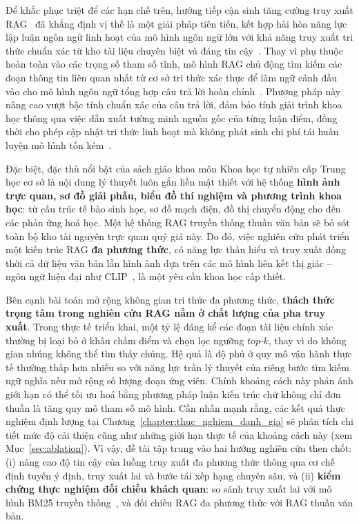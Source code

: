 Để khắc phục triệt để các hạn chế trên, hướng tiếp cận sinh tăng cường truy xuất RAG~\cite{lewis2020retrieval} đã khẳng định vị thế là một giải pháp tiên tiến, kết hợp hài hòa năng lực lập luận ngôn ngữ linh hoạt của mô hình ngôn ngữ lớn với khả năng truy xuất tri thức chuẩn xác từ kho tài liệu chuyên biệt và đáng tin cậy~\cite{gao2023ragsurvey, yan2024crag, jeong2024adaptiverag}. Thay vì phụ thuộc hoàn toàn vào các trọng số tham số tĩnh, mô hình RAG chủ động tìm kiếm các đoạn thông tin liên quan nhất từ cơ sở tri thức xác thực để làm ngữ cảnh đầu vào cho mô hình ngôn ngữ tổng hợp câu trả lời hoàn chỉnh~\cite{lewis2020retrieval, guu2020realm}. Phương pháp này nâng cao vượt bậc tính chuẩn xác của câu trả lời, đảm bảo tính giải trình khoa học thông qua việc dẫn xuất tường minh nguồn gốc của từng luận điểm, đồng thời cho phép cập nhật tri thức linh hoạt mà không phát sinh chi phí tái huấn luyện mô hình tốn kém~\cite{gao2023ragsurvey}.

Đặc biệt, đặc thù nổi bật của sách giáo khoa môn Khoa học tự nhiên cấp Trung học cơ sở là nội dung lý thuyết luôn gắn liền mật thiết với hệ thống \textbf{hình ảnh trực quan, sơ đồ giải phẫu, biểu đồ thí nghiệm và phương trình khoa học}: từ cấu trúc tế bào sinh học, sơ đồ mạch điện, đồ thị chuyển động cho đến các phản ứng hoá học. Một hệ thống RAG truyền thống thuần văn bản sẽ bỏ sót toàn bộ kho tài nguyên trực quan quý giá này. Do đó, việc nghiên cứu phát triển một kiến trúc RAG \textbf{đa phương thức}, có năng lực thấu hiểu và truy xuất đồng thời cả dữ liệu văn bản lẫn hình ảnh dựa trên các mô hình liên kết thị giác -- ngôn ngữ hiện đại như CLIP~\cite{radford2021clip}, là một yêu cầu khoa học cấp thiết.

Bên cạnh bài toán mở rộng không gian tri thức đa phương thức, \textbf{thách thức trọng tâm trong nghiên cứu RAG nằm ở chất lượng của pha truy xuất}. Trong thực tế triển khai, một tỷ lệ đáng kể các đoạn tài liệu chính xác thường bị loại bỏ ở khâu chấm điểm và chọn lọc ngưỡng $top\text{-}k$, thay vì do không gian nhúng không thể tìm thấy chúng. Hệ quả là độ phủ ở quy mô vận hành thực tế thường thấp hơn nhiều so với năng lực trần lý thuyết của riêng bước tìm kiếm ngữ nghĩa nếu mở rộng số lượng đoạn ứng viên. Chính khoảng cách này phản ánh giới hạn có thể tối ưu hoá bằng phương pháp luận kiến trúc chứ không chỉ đơn thuần là tăng quy mô tham số mô hình. Cần nhấn mạnh rằng, các kết quả thực nghiệm định lượng tại Chương~\ref{chapter:thuc_nghiem_danh_gia} sẽ phân tích chi tiết mức độ cải thiện cũng như những giới hạn thực tế của khoảng cách này (xem Mục~\ref{sec:ablation}). Vì vậy, đề tài tập trung vào hai hướng nghiên cứu then chốt: (i) nâng cao độ tin cậy của luồng truy xuất đa phương thức thông qua cơ chế định tuyến ý định, truy xuất lai và bước tái xếp hạng chuyên sâu, và (ii) \textbf{kiểm chứng thực nghiệm đối chiếu khách quan}: so sánh truy xuất lai với mô hình BM25 truyền thống~\cite{robertson2009bm25}, và đối chiếu RAG đa phương thức với RAG thuần văn bản.

